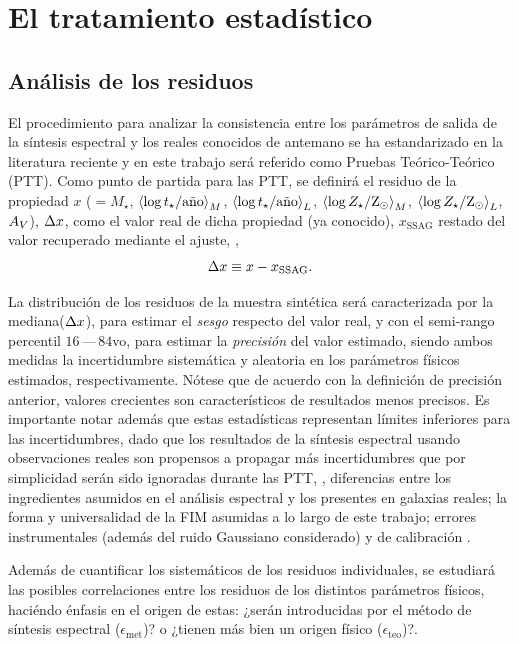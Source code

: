 \section{El tratamiento estadístico}

\subsection{Análisis de los residuos}

El procedimiento para analizar la consistencia entre los parámetros de salida de la síntesis
espectral y los reales conocidos de antemano se ha estandarizado en la literatura reciente
\citep[\eg,][]{Lee2009, Wuyts2009, Pforr2012, Mitchell2013, Magris2015} y en este trabajo será
referido como Pruebas Teórico-Teórico (PTT). Como punto de partida para las PTT, se definirá el
residuo de la propiedad $x$ ($=M_\star$, $\mwla$, $\lwla$, $\mwlz$, $\lwlz$, $\extv$), $\res{x}$,
como el valor real de dicha propiedad (ya conocido), $x_\text{SSAG}$ restado del valor recuperado
mediante el ajuste, \ie,
%
\begin{equation}\label{ec:residual}
\res{x} \equiv x - x_\text{SSAG}.
\end{equation}

La distribución de los residuos de la muestra sintética será caracterizada por la
mediana($\res{x}$), para estimar el \emph{sesgo} respecto del valor real, y con el semi-rango
percentil $16\,$---$\,84$vo, para estimar la \emph{precisión} del valor estimado, siendo ambos
medidas la incertidumbre sistemática y aleatoria en los parámetros físicos estimados,
respectivamente. Nótese que de acuerdo con la definición de precisión anterior, valores crecientes
son característicos de resultados menos precisos. Es importante notar además que estas estadísticas
representan límites inferiores para las incertidumbres, dado que los resultados de la síntesis
espectral usando observaciones reales son propensos a propagar más incertidumbres que por
simplicidad serán sido ignoradas durante las PTT, \eg, diferencias entre los ingredientes asumidos
en el análisis espectral y los presentes en galaxias reales; la forma y universalidad de la FIM
asumidas a lo largo de este trabajo; errores instrumentales (además del ruido Gaussiano considerado)
y de calibración \citep[véase][para una revisión más detallada]{Conroy2009, Conroy2010a}.

Además de cuantificar los sistemáticos de los residuos individuales, se estudiará las posibles
correlaciones entre los residuos de los distintos parámetros físicos, haciéndo énfasis en el origen
de estas: ¿serán introducidas por el método de síntesis espectral ($\epsilon_\text{met}$)? o ¿tienen
más bien un origen físico ($\epsilon_\text{teo}$)?.

